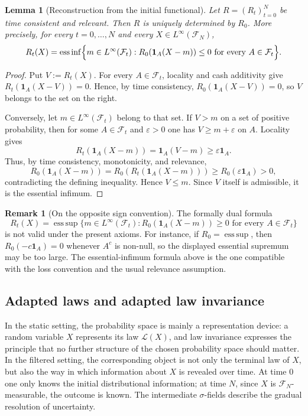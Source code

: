 \documentclass[a4paper]{amsart}
\newtheorem{lemma}[lemma]{Lemma}
\theoremstyle{definition}
\newtheorem{remark}[remark]{Remark}
\newcommand{\F}{\mathcal{F}}
\newcommand{\law}{\mathcal{L}}
\begin{document}
\begin{lemma}[Reconstruction from the initial functional]
\label{lem:reconstruction-from-R0}
Let \(R=(R_t)_{t=0}^N\) be time consistent and relevant. Then \(R\) is uniquely
determined by \(R_0\). More precisely, for every \(t=0,\dots,N\) and every
\(X\in L^\infty(\F_N)\),
\[
R_t(X)
=
\operatorname*{ess\,inf}
\Bigl\{
m\in L^\infty(\F_t):
R_0(\mathbf 1_A(X-m))\le0
\text{ for every }A\in\F_t
\Bigr\}.
\]
\end{lemma}

\begin{proof}
Put \(V:=R_t(X)\). For every \(A\in\F_t\), locality and cash additivity give
\(R_t(\mathbf 1_A(X-V))=0\). Hence, by time consistency,
\(R_0(\mathbf 1_A(X-V))=0\), so \(V\) belongs to the set on the right.

Conversely, let \(m\in L^\infty(\F_t)\) belong to that set. If
\(V>m\) on a set of positive probability, then for some
\(A\in\F_t\) and \(\varepsilon>0\) one has \(V\ge m+\varepsilon\) on \(A\).
Locality gives
\[
R_t(\mathbf 1_A(X-m))=\mathbf 1_A(V-m)\ge\varepsilon\mathbf 1_A.
\]
Thus, by time consistency, monotonicity, and relevance,
\[
R_0(\mathbf 1_A(X-m))
=
R_0(R_t(\mathbf 1_A(X-m)))
\ge
R_0(\varepsilon\mathbf 1_A)>0,
\]
contradicting the defining inequality. Hence \(V\le m\). Since \(V\) itself is
admissible, it is the essential infimum.
\end{proof}

\begin{remark}[On the opposite sign convention]
\label{rem:reconstruction-sign}
The formally dual formula
\[
R_t(X)
=
\operatorname*{ess\,sup}
\{m\in L^\infty(\F_t):
R_0(\mathbf 1_A(X-m))\ge0\text{ for every }A\in\F_t\}
\]
is not valid under the present axioms. For instance, if \(R_0=\operatorname{ess\,sup}\),
then \(R_0(-c\mathbf 1_A)=0\) whenever \(A^c\) is non-null, so the displayed
essential supremum may be too large. The essential-infimum formula above is
the one compatible with the loss convention and the usual relevance assumption.
\end{remark}


\subsection{Adapted laws and adapted law invariance}
\label{subsec:adapted-laws}

In the static setting, the probability space is mainly a representation device:
a random variable \(X\) represents its law \(\law(X)\), and law invariance
expresses the principle that no further structure of the chosen probability
space should matter. In the filtered setting, the corresponding object is not
only the terminal law of \(X\), but also the way in which information about
\(X\) is revealed over time. At time \(0\) one only knows the initial
distributional information; at time \(N\), since \(X\) is \(\F_N\)-measurable,
the outcome is known. The intermediate \(\sigma\)-fields describe the gradual
resolution of uncertainty.
\end{document}

